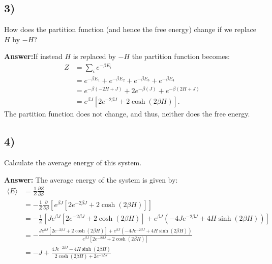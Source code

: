 \documentclass[a4paper]{article}
\newcommand{\newparagraph}{\vspace{.5cm}\noindent}
\newcommand{\average}[1]{\langle #1 \rangle}
\begin{document}
\subsection*{3)}
How does the partition function (and hence the free energy) change if we replace $H$ by $-H$?

\newparagraph
\textbf{Answer:}If instead $H$ is replaced by $-H$ the partition function becomes:
\begin{align*}
    Z &= \sum_i e^{-\beta E_i}\\
    &=e^{-\beta E_1} + e^{-\beta E_2} + e^{-\beta E_3} + e^{-\beta E_4}\\
    &= e^{-\beta (-2H + J)} + 2e^{-\beta (J)} + e^{-\beta (2H + J)}\\
    &= e^{\beta J}\left[2e^{-2\beta J} + 2\cosh(2\beta H)\right].
\end{align*}The partition function does not change, and thus, neither does the free energy.

\subsection*{4)}
Calculate the average energy of this system.

\newparagraph
\textbf{Answer:} The average energy of the system is given by:
\begin{align*}
    \average{E} &= \frac{1}{Z}\frac{\partial Z}{\partial \beta}\\
    &= -\frac{1}{Z}\frac{\partial}{\partial \beta}\left[e^{\beta J}\left[2e^{-2\beta J} + 2\cosh(2\beta H)\right]\right]\\
    &= -\frac{1}{Z}\left[Je^{\beta J}\left[2e^{-2\beta J} + 2\cosh(2\beta H)\right] + e^{\beta J}\left(-4Je^{-2\beta J} +4H\sinh(2\beta H)\right)\right]\\
    &= -\frac{Je^{\beta J}\left[2e^{-2\beta J} + 2\cosh(2\beta H)\right] + e^{\beta J}\left(-4Je^{-2\beta J} +4H\sinh(2\beta H)\right)}{e^{\beta J}\left[2e^{-2\beta J} + 2\cosh(2\beta H)\right]}\\
    &= -J + \frac{4Je^{-2\beta J} - 4H\sinh(2\beta H)}{2\cosh(2\beta H) + 2e^{-2\beta J}}
\end{align*}
\begin{comment}
\begin{align*}
    \average{E} &= \frac{1}{Z}\frac{\partial Z}{\partial \beta}\\
    &= -\frac{1}{Z}\frac{\partial}{\partial \beta}\left[e^{\beta J}\left[2 + 2\cosh(2\beta H)\right]\right]\\
    &= -\frac{1}{Z}\left[e^{\beta J}J\left[2 + 2\cosh(2\beta H)\right] + e^{\beta J}\left[4H\sinh(2\beta H)\right]\right]\\
    &= -\frac{1}{Z}e^{\beta J}\left[J\left[2 + 2\cosh(2\beta H)\right] + \left[4H\sinh(2\beta H)\right]\right]\\
    &= -\frac{J\left(2 + 2\cosh(2\beta H)\right) + 4H\sinh(2\beta H)}{2 + 2\cosh(2\beta H)}\\
    &=  -\left[J+ 2H\tanh(\beta H)\right]
\end{align*}
\end{comment}
\end{document}
